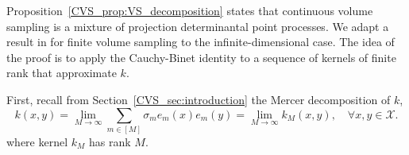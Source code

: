 \documentclass[twoside,11pt]{book}
\numberwithin{theorem}{chapter}
\numberwithin{definition}{chapter}
\numberwithin{proposition}{chapter}
\numberwithin{corollary}{chapter}
\numberwithin{example}{chapter}
\numberwithin{lemma}{chapter}
\numberwithin{assumption}{chapter}
\begin{document}
Proposition~\ref{CVS_prop:VS_decomposition} states that continuous volume sampling is a mixture of projection determinantal point processes. We adapt a result in \citep[Chapter 5]{KuTa12} for finite volume sampling to the infinite-dimensional case. The idea of the proof is to apply the Cauchy-Binet identity to a sequence of kernels of finite rank that approximate $k$.

First, recall from Section~\ref{CVS_sec:introduction} the Mercer decomposition of $k$,
\begin{equation}\label{CVS_eq:Mercer_decomposition_1}
k(x,y) = \lim_{M\rightarrow \infty}\sum\limits_{m\in [M]} \sigma_{m} e_{m}(x)e_{m}(y) = \lim_{M\rightarrow \infty} k_M(x,y), \quad\forall x,y\in\mathcal{X}.
\end{equation}
where kernel $k_M$ has rank $M$.
\end{document}
